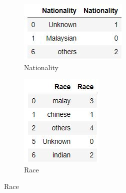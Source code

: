 \documentclass[11pt]{article}
\begin{document}
\begin{figure}[H]
\centering
\begin{subfigure}{.5\textwidth}
  \centering
  \includegraphics[width=.7\linewidth]{LabelEncodingNationality}
  \caption{Nationality}
  \label{fig:LabelEncodingAddress}
\end{subfigure}%
\begin{subfigure}{.5\textwidth}
  \centering
  \includegraphics[width=.5\linewidth]{LabelEncodingRace}
  \caption{Race}
  \label{fig:LabelEncodingEdu}
\end{subfigure}
\label{fig:test}


\end{figure}
\end{document}
